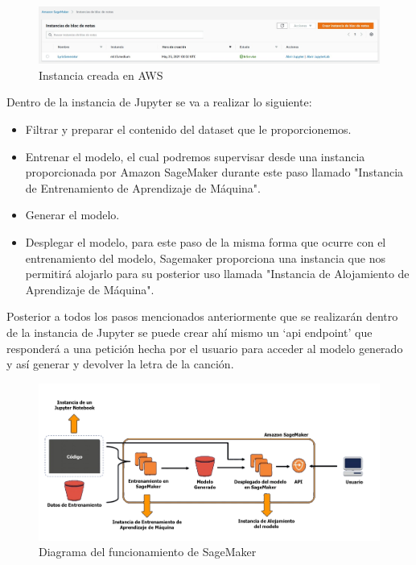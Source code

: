 \documentclass[12pt, a4paper, titlepage]{report}
\begin{document}
		\begin{figure}[H]
			\includegraphics[width=16cm]{./imagenes/Disenio/Iteracion_4/JupyterInstance.jpg}
			\centering 
			\caption{Instancia creada en AWS}
		\end{figure}
	
	Dentro de la instancia de Jupyter se va a realizar lo siguiente:
	
	\begin{itemize}
		\item Filtrar y preparar el contenido del dataset que le proporcionemos.
		\item Entrenar el modelo, el cual podremos supervisar desde una instancia proporcionada por Amazon SageMaker durante este paso llamado "Instancia de Entrenamiento de Aprendizaje de Máquina".
		\item Generar el modelo.
		\item Desplegar el modelo, para este paso de la misma forma que ocurre con el entrenamiento del modelo, Sagemaker proporciona una instancia que nos permitirá alojarlo para su posterior uso llamada "Instancia de Alojamiento de Aprendizaje de Máquina".
	\end{itemize}
	
	Posterior a todos los pasos mencionados anteriormente que se realizarán dentro de la instancia de Jupyter se puede crear ahí mismo un `\acrshort{api} endpoint' que responderá a una petición hecha por el usuario para acceder al modelo generado y así generar y devolver la letra de la canción.
	
	\begin{figure}[H]
		\includegraphics[width=15cm]{./imagenes/Disenio/Iteracion_4/sagemaker_function.png}
		\centering 
		\caption{Diagrama del funcionamiento de SageMaker}
	\end{figure}
	
\end{document}
